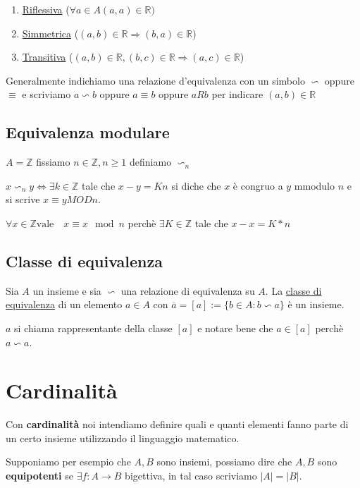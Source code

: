 \documentclass{article}
\begin{document}
\begin{enumerate}
        \item \underline{Riflessiva} ($\forall a \in A (a,a) \in \mathbb{R})$
        \item \underline{Simmetrica} ($(a,b) \in \mathbb{R} \Rightarrow (b,a) \in \mathbb{R}$)
        \item \underline{Transitiva} ($(a,b) \in \mathbb{R},(b,c) \in \mathbb{R} \Rightarrow (a,c) \in \mathbb{R}$)
\end{enumerate}


Generalmente indichiamo una relazione d'equivalenza con un simbolo  $\backsim$ oppure $\equiv$ e scriviamo $a \backsim b$ oppure $a \equiv b$ oppure $aRb$ per indicare $(a,b) \in \mathbb{R}$


\subsection{Equivalenza modulare}
$A = \mathbb{Z}$ fissiamo $n \in \mathbb{Z}, n \geq 1$ definiamo $\backsim_n$ \par
$x \backsim_n y \Leftrightarrow \exists k \in \mathbb{Z}$ tale che $x-y = Kn$ si diche che $x$ è congruo a $y$ mmodulo $n$ e si scrive $x \equiv y MOD n$.


$\forall x \in \mathbb{Z} \mbox{vale} \quad x \equiv x \mod n$ perchè $\exists K \in \mathbb{Z}$ tale che $x-x = K*n$ 


\subsection{Classe di equivalenza}
Sia $A$ un insieme e sia $\backsim$ una relazione di equivalenza su $A$. La \underline{classe di equivalenza} di un elemento $a \in A$ con $\overline{a} = [a] := \{b\in A : b \backsim a\}$ è un insieme. \par
$a$ si chiama rappresentante della classe $[a]$ e notare bene che $a \in [a]$ perchè $a \backsim a$.




\newpage
\section{Cardinalità}
Con \textbf{cardinalità} noi intendiamo definire quali e quanti elementi fanno parte di un certo insieme utilizzando il linguaggio matematico. \par

Supponiamo per esempio che $A,B$ sono insiemi, possiamo dire che $A,B$ sono \textbf{equipotenti} se $\exists f:A \rightarrow B$ bigettiva, in tal caso scriviamo $|A| = |B|$. \par
\end{document}
